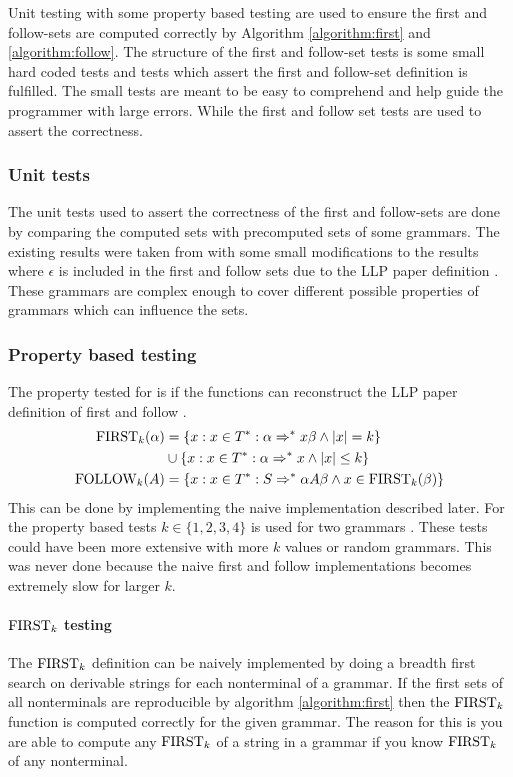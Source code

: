 Unit testing with some property based testing are used to ensure the first and follow-sets are computed correctly by Algorithm \ref{algorithm:first} and \ref{algorithm:follow}. The structure of the first and follow-set tests is some small hard coded tests and tests which assert the first and follow-set definition is fulfilled. The small tests are meant to be easy to comprehend and help guide the programmer with large errors. While the first and follow set tests are used to assert the correctness.

\subsubsection{Unit tests}
The unit tests used to assert the correctness of the first and follow-sets are done by comparing the computed sets with precomputed sets of some grammars. The existing results were taken from \cite[58, 62, 63, 65]{Mogensen} with some small modifications to the results where $\epsilon$ is included in the first and follow sets due to the LLP paper definition \cite[5]{Vagner2007}. These grammars are complex enough to cover different possible properties of grammars which can influence the sets.

\subsubsection{Property based testing}
The property tested for is if the functions can reconstruct the LLP paper definition of first and follow \cite[5]{Vagner2007}.
\begin{align*}
    \text{FIRST}_k(\alpha) &= \{x : x \in T^* : \alpha \Rightarrow^* x \beta \land |x| = k\} \\ 
    \, &\cup \{x : x \in T^* : \alpha \Rightarrow^* x \land |x| \leq k\} \\
    \text{FOLLOW}_k(A) &= \{x : x \in T^* : S \Rightarrow^* \alpha A \beta \land x \in \text{FIRST}_k(\beta)\}
\end{align*}
This can be done by implementing the naive implementation described later. For the property based tests $k \in \{1, 2, 3, 4\}$ is used for two grammars \cite[62, 63]{Mogensen}. These tests could have been more extensive with more $k$ values or random grammars. This was never done because the naive first and follow implementations becomes extremely slow for larger $k$.

\paragraph{\texorpdfstring{$\text{FIRST}_k$}{TEXT} testing}
The $\text{FIRST}_k$ definition can be naively implemented by doing a breadth first search on derivable strings for each nonterminal of a grammar. If the first sets of all nonterminals are reproducible by algorithm \ref{algorithm:first} then the $\text{FIRST}_k$ function is computed correctly for the given grammar. The reason for this is you are able to compute any $\text{FIRST}_k$ of a string in a grammar if you know $\text{FIRST}_k$ of any nonterminal.

